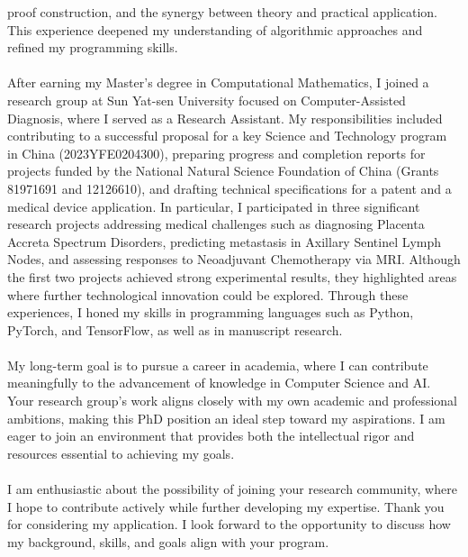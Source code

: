\documentclass[11pt,a4paper, final]{moderncv}
\begin{document}
proof construction, and the synergy between theory and practical application. 
This experience deepened my understanding of algorithmic approaches and refined my programming skills. 
\ \\
\ \\
After earning my Master's degree in Computational Mathematics, 
I joined a research group at Sun Yat-sen University focused on Computer-Assisted Diagnosis, 
where I served as a Research Assistant. 
My responsibilities included contributing to a successful proposal for 
a key Science and Technology program in China (2023YFE0204300), 
preparing progress and completion reports for projects funded by 
the National Natural Science Foundation of China (Grants 81971691 and 12126610), 
and drafting technical specifications for a patent and a medical device application. 
In particular, I participated in three significant research projects addressing medical challenges 
such as diagnosing Placenta Accreta Spectrum Disorders, 
predicting metastasis in Axillary Sentinel Lymph Nodes, and assessing responses to Neoadjuvant Chemotherapy via MRI. 
Although the first two projects achieved strong experimental results, 
they highlighted areas where further technological innovation could be explored. 
Through these experiences, I honed my skills in programming languages 
such as Python, PyTorch, and TensorFlow, as well as in manuscript research.
\ \\
\ \\
My long-term goal is to pursue a career in academia, 
where I can contribute meaningfully to the advancement of knowledge in Computer Science and AI. 
Your research group's work aligns closely with my own academic and professional ambitions, 
making this PhD position an ideal step toward my aspirations. 
I am eager to join an environment that provides both the intellectual rigor and resources essential to achieving my goals.
\ \\
\ \\
I am enthusiastic about the possibility of joining your research community, 
where I hope to contribute actively while further developing my expertise. 
Thank you for considering my application. 
I look forward to the opportunity to discuss how my background, skills, and goals align with your program.

\makeletterclosing
\end{document}
